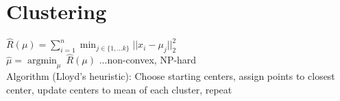 \section*{Clustering}
$\hat{R}(\mu) = \sum_{i=1}^n {\operatorname{min}_{j\in\{1,...k\}}}||x_i-\mu_j||_2^2$\\
$\hat{\mu} =  {\operatorname{argmin}}_\mu ~ \hat{R}(\mu)$ ...non-convex, NP-hard \\
Algorithm (Lloyd's heuristic): Choose starting centers, assign points to closest center, update centers to mean of each cluster, repeat

